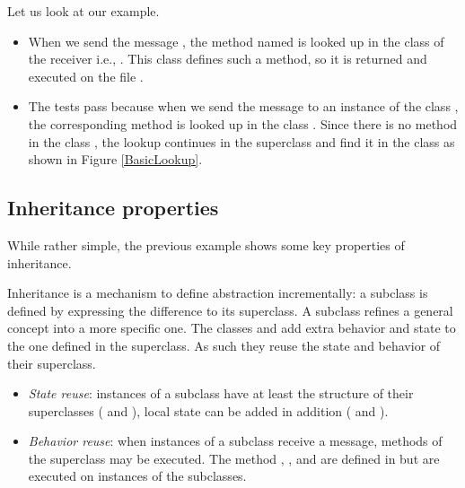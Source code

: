 \documentclass[10pt,twoside,english]{_support/latex/sbabook/sbabook}
\begin{document}
Let us look at our example. 

\begin{itemize}
\item When we send the message , the method named  is looked up in the class of the receiver i.e., . This class defines such a method, so it is returned and executed on the file .
\end{itemize}

\begin{itemize}
\item The tests pass because when we send the message  to an instance of the class , the corresponding method is looked up in the class . Since there is no method  in the class , the lookup continues in the superclass and find it in the class  as shown in Figure \ref{BasicLookup}.
\end{itemize}
\subsection{Inheritance properties}
While rather simple, the previous example shows some key properties of inheritance. 

Inheritance is a mechanism to define abstraction incrementally: a subclass is defined by expressing the difference to its superclass. A subclass refines a general concept into a more specific one. The classes  and  add extra behavior and state to the one defined in the superclass. As such they reuse the state and behavior of their superclass.

\begin{itemize}
\item \textit{State reuse}: instances of a subclass have at least the structure of their superclasses ( and ), local state can be added in addition ( and ).
\end{itemize}

\begin{itemize}
\item \textit{Behavior reuse}: when instances of a subclass receive a message, methods of the superclass may be executed. The method , , and  are defined in  but are executed on instances of the subclasses.
\end{itemize}
\end{document}

